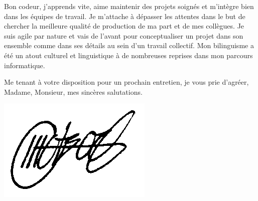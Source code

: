 \documentclass[12pt,a4paper]{article}
\begin{document}
Bon codeur, j'apprends vite, aime maintenir des projets
soignés et m'intègre bien dans les équipes de travail.
Je m'attache à dépasser les attentes dans le but de chercher
la meilleure qualité de production de ma part et de mes collègues.
Je suis agile par nature et vais de l'avant pour conceptualiser un projet
dans son ensemble comme dans ses détails au sein d'un travail collectif.
Mon bilinguisme a été un atout culturel et linguistique à de nombreuses
reprises dans mon parcours informatique.



Me tenant à votre disposition pour un prochain entretien,
je vous prie d'agréer, Madame, Monsieur,
mes sincères salutations.

\vspace*{\fill}

{
    \hspace*{\fill}
    \begin{minipage}{.4\textwidth}
        \includegraphics[width=.45\textwidth]{sig.png}
    \end{minipage}
}
\end{document}
